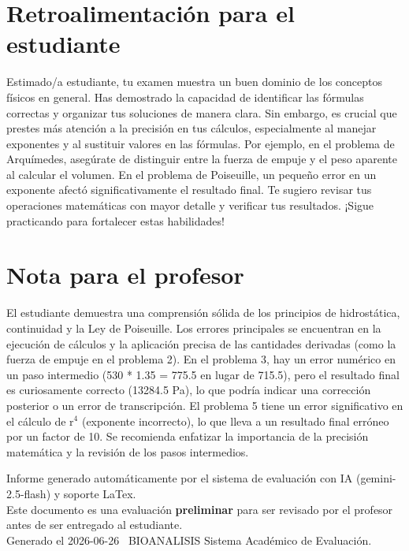 \documentclass[11pt,a4paper]{article}
\begin{document}
\section*{Retroalimentación para el estudiante}
\begin{tcolorbox}[cajaRecomendacion, title={Dirigido a: valeria marrero 34264302}]
Estimado/a estudiante, tu examen muestra un buen dominio de los conceptos físicos en general. Has demostrado la capacidad de identificar las fórmulas correctas y organizar tus soluciones de manera clara. Sin embargo, es crucial que prestes más atención a la precisión en tus cálculos, especialmente al manejar exponentes y al sustituir valores en las fórmulas. Por ejemplo, en el problema de Arquímedes, asegúrate de distinguir entre la fuerza de empuje y el peso aparente al calcular el volumen. En el problema de Poiseuille, un pequeño error en un exponente afectó significativamente el resultado final. Te sugiero revisar tus operaciones matemáticas con mayor detalle y verificar tus resultados. ¡Sigue practicando para fortalecer estas habilidades!
\end{tcolorbox}

\section*{Nota para el profesor}
\begin{tcolorbox}[
  enhanced, breakable,
  colback=yellow!8, colframe=yellow!60!black,
  fonttitle=\bfseries, coltitle=black,
  title={Observaciones para revisión manual},
  top=4pt, bottom=4pt, left=8pt, right=8pt,
]
El estudiante demuestra una comprensión sólida de los principios de hidrostática, continuidad y la Ley de Poiseuille. Los errores principales se encuentran en la ejecución de cálculos y la aplicación precisa de las cantidades derivadas (como la fuerza de empuje en el problema 2). En el problema 3, hay un error numérico en un paso intermedio (530 * 1.35 = 775.5 en lugar de 715.5), pero el resultado final es curiosamente correcto (13284.5 Pa), lo que podría indicar una corrección posterior o un error de transcripción. El problema 5 tiene un error significativo en el cálculo de r$^{4}$ (exponente incorrecto), lo que lleva a un resultado final erróneo por un factor de 10. Se recomienda enfatizar la importancia de la precisión matemática y la revisión de los pasos intermedios.
\end{tcolorbox}

\vspace{12pt}
\begin{center}
  \footnotesize\color{gray}
  Informe generado automáticamente por el sistema de evaluación con IA (gemini-2.5-flash) y soporte LaTex. \\
  Este documento es una evaluación \textbf{preliminar} para ser revisado por el profesor antes de ser entregado al 
  estudiante. \\
  Generado el 2026-06-26 \textbullet\ BIOANALISIS Sistema Académico de Evaluación.
  \end{center}
\end{document}
